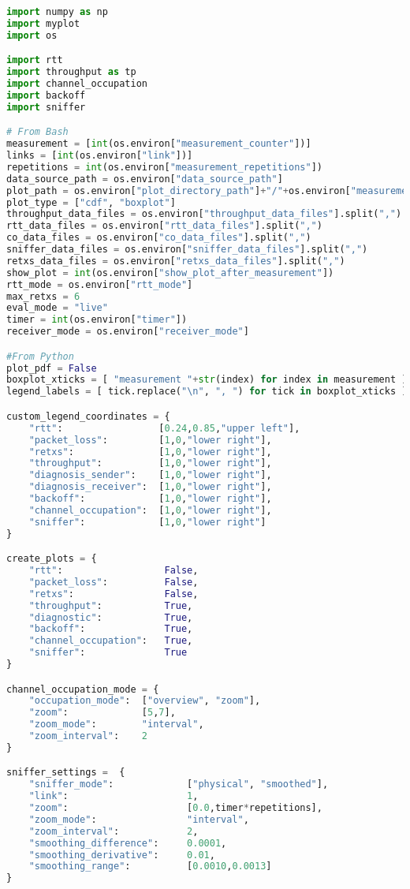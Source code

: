 \begin{lstlisting}[language=Python,caption=evaluation.py]
import numpy as np
import myplot
import os

import rtt
import throughput as tp
import channel_occupation
import backoff
import sniffer

# From Bash
measurement = [int(os.environ["measurement_counter"])]
links = [int(os.environ["link"])]
repetitions = int(os.environ["measurement_repetitions"])
data_source_path = os.environ["data_source_path"]
plot_path = os.environ["plot_directory_path"]+"/"+os.environ["measurement_counter"]+"/"
plot_type = ["cdf", "boxplot"]
throughput_data_files = os.environ["throughput_data_files"].split(",")
rtt_data_files = os.environ["rtt_data_files"].split(",")
co_data_files = os.environ["co_data_files"].split(",")
sniffer_data_files = os.environ["sniffer_data_files"].split(",")
retxs_data_files = os.environ["retxs_data_files"].split(",")
show_plot = int(os.environ["show_plot_after_measurement"])
rtt_mode = os.environ["rtt_mode"]
max_retxs = 6
eval_mode = "live"
timer = int(os.environ["timer"])
receiver_mode = os.environ["receiver_mode"]

#From Python
plot_pdf = False
boxplot_xticks = [ "measurement "+str(index) for index in measurement ]
legend_labels = [ tick.replace("\n", ", ") for tick in boxplot_xticks ]

custom_legend_coordinates = {
    "rtt":                 [0.24,0.85,"upper left"],
    "packet_loss":         [1,0,"lower right"],
    "retxs":               [1,0,"lower right"],
    "throughput":          [1,0,"lower right"],
    "diagnosis_sender":    [1,0,"lower right"],
    "diagnosis_receiver":  [1,0,"lower right"],
    "backoff":             [1,0,"lower right"],
    "channel_occupation":  [1,0,"lower right"],
    "sniffer":             [1,0,"lower right"]
}

create_plots = {
    "rtt":                  False,
    "packet_loss":          False,
    "retxs":                False,
    "throughput":           True,
    "diagnostic":           True,
    "backoff":              True,
    "channel_occupation":   True,
    "sniffer":              True
}

channel_occupation_mode = {
    "occupation_mode":  ["overview", "zoom"],
    "zoom":             [5,7],
    "zoom_mode":        "interval",
    "zoom_interval":    2
}

sniffer_settings =  {
    "sniffer_mode":             ["physical", "smoothed"],
    "link":                     1,
    "zoom":                     [0.0,timer*repetitions],
    "zoom_mode":                "interval",
    "zoom_interval":            2,
    "smoothing_difference":     0.0001,
    "smoothing_derivative":     0.01,
    "smoothing_range":          [0.0010,0.0013]
}


\end{lstlisting}

